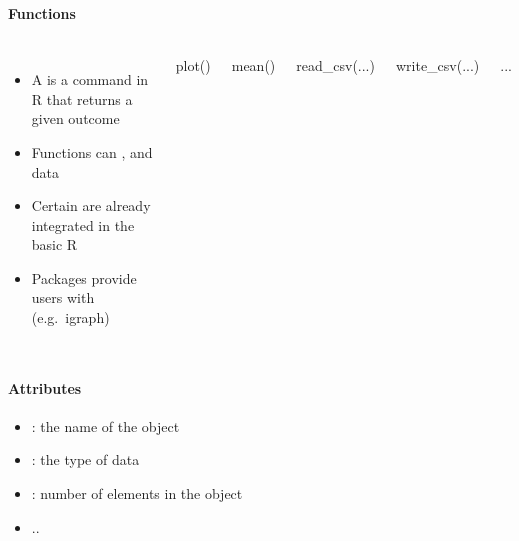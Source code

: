 \documentclass[8pt]{beamer}
\begin{document}
\begin{frame}
\begin{columns}[c]
\begin{minipage}[c][.5\textheight][c]{\linewidth}
\end{minipage}	

\end{columns}


\end{frame}


\begin{frame}
\frametitle{\insertsection}
\framesubtitle{Functions}

\begin{columns}[c]

\begin{itemize}
\item A {\color{blue}{function}} is a command in R that returns a given outcome
\item Functions can {\color{blue}{read}}, {\color{blue}{manipulate}} and {\color{blue}{analyse}} data
\item Certain {\color{blue}{base functions}} are already integrated in the basic R
\item Packages provide users with {\color{blue}{additional functions}} (e.g.\ igraph)
\end{itemize}
    	   
\footnotesize
\centering

plot()

\medskip

mean()

\medskip

read\_csv(...)

\medskip

write\_csv(...)

...


\end{columns}


\end{frame}


\begin{frame}
\frametitle{\insertsection}
\framesubtitle{Attributes}

\begin{itemize}
\item {\color{blue}{name}}: the name of the object
\item {\color{blue}{mode}}: the type of data
\item {\color{blue}{length}}: number of elements in the object
\item ..
\end{itemize}

\end{frame}
\end{document}
